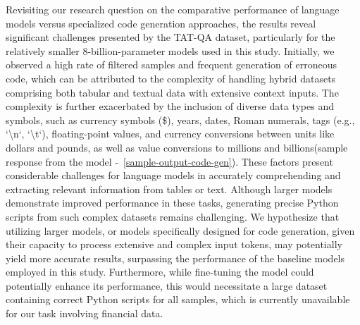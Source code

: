 \documentclass[logo,msc]{infthesis}           %
\begin{document}
Revisiting our research question on the comparative performance of language models versus specialized code generation approaches, the results reveal significant challenges presented by the TAT-QA dataset, particularly for the relatively smaller 8-billion-parameter models used in this study. Initially, we observed a high rate of filtered samples and frequent generation of erroneous code, which can be attributed to the complexity of handling hybrid datasets comprising both tabular and textual data with extensive context inputs. The complexity is further exacerbated by the inclusion of diverse data types and symbols, such as currency symbols (\$), years, dates, Roman numerals, tags (e.g., `\textbackslash n`, `\textbackslash t`), floating-point values, and currency conversions between units like dollars and pounds, as well as value conversions to millions and billions(sample response from the model -~\ref{sample-output-code-gen}). These factors present considerable challenges for language models in accurately comprehending and extracting relevant information from tables or text. Although larger models demonstrate improved performance in these tasks, generating precise Python scripts from such complex datasets remains challenging. We hypothesize that utilizing larger models, or models specifically designed for code generation, given their capacity to process extensive and complex input tokens, may potentially yield more accurate results, surpassing the performance of the baseline models employed in this study. Furthermore, while fine-tuning the model could potentially enhance its performance, this would necessitate a large dataset containing correct Python scripts for all samples, which is currently unavailable for our task involving financial data.

\hspace{5cm}
\begin{comment}
[IS THE LINE PLOT REQUIRED?? 
SHALL I ADD EXAMPLES FROM CODE GENERATION IN THE BODY OR THE APPENDIX (SIZE LIMIT OF THE INPUT Examples)

1. Add abstract
2. Mention or omit - about codellama python performance - modify code gen section a bit ??? 
3. add all the 4 samples in appendix
4. add code gen output and quality in the appendix
5. add best model response output - 5 samples - appendix
6. Write conclusion and future work
7. Proof read everything and fix small discrepancies
8. More num of references if there is a number required
]
\end{comment}
\end{document}
